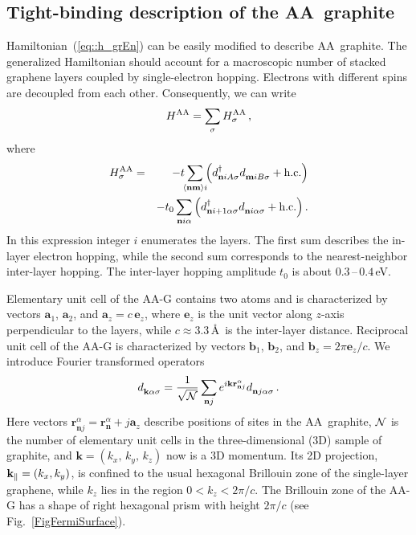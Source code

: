\documentclass[prb,twocolumn,showpacs,aps,superscriptaddress,floatfix]{revtex4}
\begin{document}
\subsection{Tight-binding description of the AA~graphite}

Hamiltonian~(\ref{eq::h_grEn})
can be easily modified to describe AA~graphite. The generalized
Hamiltonian should account for a macroscopic number of stacked graphene
layers coupled by single-electron hopping. Electrons with different spins
are decoupled from each other. Consequently, we can write
\begin{equation}
\label{eq::HAAtbfull}
H^{\rm AA}=\sum_\sigma H_\sigma^{\rm AA}\,,
\end{equation}
where
\begin{eqnarray}
\label{eq::HAAtb}
H_\sigma^{\rm AA}
&=&-t\!\!
\sum_{\langle\mathbf{nm}\rangle i}\!\!
	\left(
		d_{\mathbf{n}iA\sigma}^{\dag}
		d_{\mathbf{m}iB\sigma }^{\phantom{\dag}}
		+
		\text{h.c.}
	\right)
\nonumber\\
&&-t_0
\sum_{\mathbf{n}i\alpha}
	\left(
		d_{\mathbf{n}i+1\alpha\sigma}^{\dag}
		d_{\mathbf{n}i\alpha\sigma }^{\phantom{\dag}}
		+
		\text{h.c.}
	\right).
\end{eqnarray}
In this expression integer $i$ enumerates the layers. The first sum
describes the in-layer electron hopping, while the second sum corresponds
to the nearest-neighbor inter-layer hopping. The inter-layer hopping
amplitude
$t_0$
is about
$0.3$\,--\,$0.4$\,eV.

Elementary unit cell of the AA-G contains two atoms and is characterized by
vectors
$\mathbf{a}_1$,
$\mathbf{a}_2$,
and
$\mathbf{a}_{z}=c\,\mathbf{e}_z$,
where
$\mathbf{e}_z$
is the unit vector along
$z$-axis
perpendicular to the layers, while
$c\approx3.3$\,\AA\
is the inter-layer distance. Reciprocal unit cell of the AA-G  is
characterized by vectors
$\mathbf{b}_1$,
$\mathbf{b}_2$,
and
$\mathbf{b}_{z}=2\pi\mathbf{e}_z/c$.
We introduce Fourier transformed operators
\begin{equation}
d_{\mathbf{k}\alpha\sigma}^{\phantom{\dag}}=\frac{1}{\sqrt{\cal N}}\sum_{\mathbf{n}j}e^{i\mathbf{kr}_{\mathbf{n}j}^{\alpha}}d_{\mathbf{n}j\alpha\sigma}^{\phantom{\dag}}\,.
\end{equation}
Here vectors
$\mathbf{r}_{\mathbf{n}j}^{\alpha}
=
\mathbf{r}_{\mathbf{n}}^{\alpha}+j\mathbf{a}_z$
describe positions of sites in the AA~graphite,
${\cal N}$
is the number of elementary unit cells in the three-dimensional (3D)
sample of graphite, and
$\mathbf{k}=(k_x,\,k_y,\,k_z)$
now is a 3D momentum. Its 2D projection,
${\bf k}_{\|}=(k_x, k_y)$,
is confined to the usual hexagonal Brillouin zone of the single-layer
graphene, while
$k_z$
lies in the region
$0<k_z<2\pi/c$.
The Brillouin zone of the AA-G has a shape of right hexagonal prism with
height
$2\pi/c$
(see
Fig.~\ref{FigFermiSurface}).
\end{document}
